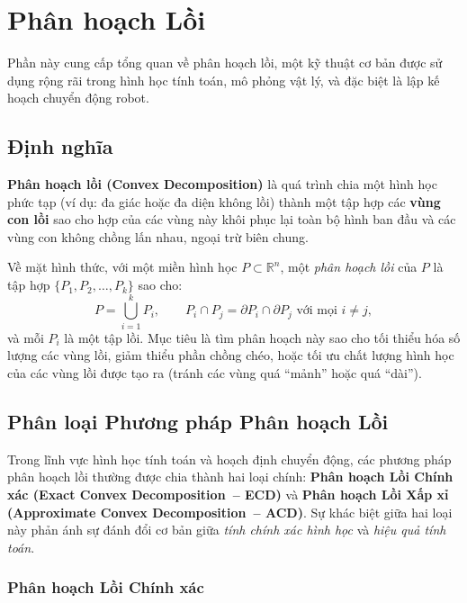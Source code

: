 \section{Phân hoạch Lồi}
\label{sec:convex-decomposition}

Phần này cung cấp tổng quan về phân hoạch lồi, một kỹ thuật cơ bản được sử dụng rộng rãi trong
hình học tính toán, mô phỏng vật lý, và đặc biệt là lập kế hoạch chuyển động robot.

\subsection{Định nghĩa}

\textbf{Phân hoạch lồi (Convex Decomposition)} là quá trình chia một hình học phức tạp (ví dụ:
đa giác hoặc đa diện không lồi) thành một tập hợp các \textbf{vùng con lồi} sao cho hợp của các
vùng này khôi phục lại toàn bộ hình ban đầu và các vùng con không chồng lấn nhau, ngoại trừ biên
chung.

Về mặt hình thức, với một miền hình học $P \subset \mathbb{R}^n$, một \textit{phân hoạch lồi} của
$P$ là tập hợp $\{P_1, P_2, \dots, P_k\}$ sao cho:
\[
    P = \bigcup_{i=1}^{k} P_i,
    \qquad
    P_i \cap P_j = \partial P_i \cap \partial P_j \text{ với mọi } i \ne j,
\]
và mỗi $P_i$ là một tập lồi.
Mục tiêu là tìm phân hoạch này sao cho tối thiểu hóa số lượng các vùng lồi, giảm thiểu phần chồng
chéo, hoặc tối ưu chất lượng hình học của các vùng lồi được tạo ra (tránh các vùng quá ``mảnh'' hoặc
quá ``dài'').

\subsection{Phân loại Phương pháp Phân hoạch Lồi}
\label{sec:convex-decomposition-types}

Trong lĩnh vực hình học tính toán và hoạch định chuyển động, các phương pháp phân hoạch lồi thường
được chia thành hai loại chính:
\textbf{Phân hoạch Lồi Chính xác (Exact Convex Decomposition~-- ECD)}
và
\textbf{Phân hoạch Lồi Xấp xỉ (Approximate Convex Decomposition~-- ACD)}.
Sự khác biệt giữa hai loại này phản ánh sự đánh đổi cơ bản giữa \textit{tính chính xác hình học}
và \textit{hiệu quả tính toán}.

\subsubsection{Phân hoạch Lồi Chính xác}

